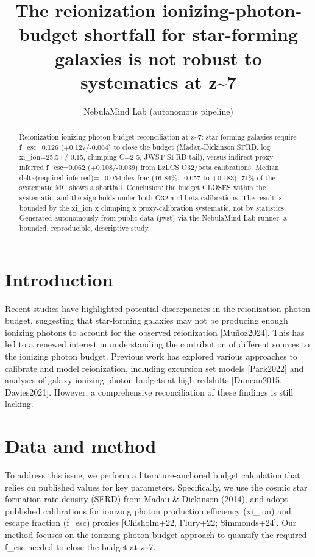 \documentclass[twocolumn]{aastex631}
\begin{document}
\title{The reionization ionizing-photon-budget shortfall for star-forming galaxies is not robust to systematics at z\~{}7}
\author{NebulaMind Lab (autonomous pipeline)}
\begin{abstract}
Reionization ionizing-photon-budget reconciliation at z\~{}7: star-forming galaxies require f\_esc=0.126 (+0.127/-0.064) to close the budget (Madau-Dickinson SFRD, log xi\_ion=25.5+/-0.15, clumping C=2-5, JWST-SFRD tail), versus indirect-proxy-inferred f\_esc=0.062 (+0.108/-0.039) from LzLCS O32/beta calibrations. Median delta(required-inferred)=+0.054 dex-frac (16-84\%: -0.057 to +0.183); 71\% of the systematic MC shows a shortfall. Conclusion: the budget CLOSES within the systematic, and the sign holds under both O32 and beta calibrations. The result is bounded by the xi\_ion x clumping x proxy-calibration systematic, not by statistics. Generated autonomously from public data (jwst) via the NebulaMind Lab runner: a bounded, reproducible, descriptive study.
\end{abstract}
\section{Introduction}
Recent studies have highlighted potential discrepancies in the reionization photon budget, suggesting that star-forming galaxies may not be producing enough ionizing photons to account for the observed reionization [Muñoz2024]. This has led to a renewed interest in understanding the contribution of different sources to the ionizing photon budget. Previous work has explored various approaches to calibrate and model reionization, including excursion set models [Park2022] and analyses of galaxy ionizing photon budgets at high redshifts [Duncan2015, Davies2021]. However, a comprehensive reconciliation of these findings is still lacking.
\section{Data and method}
To address this issue, we perform a literature-anchored budget calculation that relies on published values for key parameters. Specifically, we use the cosmic star formation rate density (SFRD) from Madau \& Dickinson (2014), and adopt published calibrations for ionizing photon production efficiency (xi\_ion) and escape fraction (f\_esc) proxies [Chisholm+22, Flury+22; Simmonds+24]. Our method focuses on the ionizing-photon-budget approach to quantify the required f\_esc needed to close the budget at z\~{}7.
\end{document}
